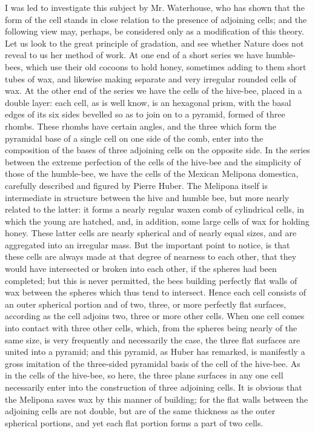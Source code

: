 \indent I was led to investigate this subject by Mr. Waterhouse, who has shown that the form of the cell stands in close relation to the presence of adjoining cells; and the following view may, perhaps, be considered only as a modification of this theory. Let us look to the great principle of gradation, and see whether Nature does not reveal to us her method of work. At one end of a short series we have humble-bees, which use their old cocoons to hold honey, sometimes adding to them short tubes of wax, and likewise making separate and very irregular rounded cells of wax. At the other end of the series we have the cells of the hive-bee, placed in a double layer: each cell, as is well know, is an hexagonal prism, with the basal edges of its six sides bevelled so as to join on to a pyramid, formed of three rhombs. These rhombs have certain angles, and the three which form the pyramidal base of a single cell on one side of the comb, enter into the composition of the bases of three adjoining cells on the opposite side. In the series between the extreme perfection of the cells of the hive-bee and the simplicity of those of the humble-bee, we have the cells of the Mexican Melipona domestica, carefully described and figured by Pierre Huber. The Melipona itself is intermediate in structure between the hive and humble bee, but more nearly related to the latter: it forms a nearly regular waxen comb of cylindrical cells, in which the young are hatched, and, in addition, some large cells of wax for holding honey. These latter cells are nearly spherical and of nearly equal sizes, and are aggregated into an irregular mass. But the important point to notice, is that these cells are always made at that degree of nearness to each other, that they would have intersected or broken into each other, if the spheres had been completed; but this is never permitted, the bees building perfectly flat walls of wax between the spheres which thus tend to intersect. Hence each cell consists of an outer spherical portion and of two, three, or more perfectly flat surfaces, according as the cell adjoins two, three or more other cells. When one cell comes into contact with three other cells, which, from the spheres being nearly of the same size, is very frequently and necessarily the case, the three flat surfaces are united into a pyramid; and this pyramid, as Huber has remarked, is manifestly a gross imitation of the three-sided pyramidal basis of the cell of the hive-bee. As in the cells of the hive-bee, so here, the three plane surfaces in any one cell necessarily enter into the construction of three adjoining cells. It is obvious that the Melipona saves wax by this manner of building; for the flat walls between the adjoining cells are not double, but are of the same thickness as the outer spherical portions, and yet each flat portion forms a part of two cells.\\
